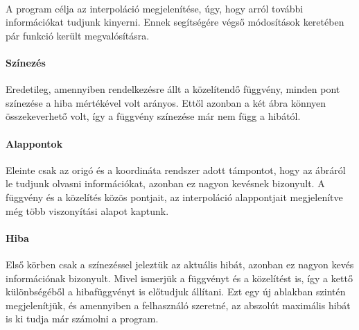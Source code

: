 \documentclass[12pt]{report}
\begin{document}
\paragraph{}
A program célja az interpoláció megjelenítése, úgy, hogy arról további információkat tudjunk kinyerni. Ennek segítségére végső módosítások keretében pár funkció került megvalósításra.

\paragraph{Színezés}
Eredetileg, amennyiben rendelkezésre állt a közelítendő függvény, minden pont színezése a hiba mértékével volt arányos. Ettől azonban a két ábra könnyen összekeverhető volt, így a függvény színezése már nem függ a hibától.

\paragraph{Alappontok}
Eleinte csak az origó és a koordináta rendszer adott támpontot, hogy az ábráról le tudjunk olvasni információkat, azonban ez nagyon kevésnek bizonyult. A függvény és a közelítés közös pontjait, az interpoláció alappontjait megjelenítve még több viszonyítási alapot kaptunk.

\paragraph{Hiba}
Első körben csak a színezéssel jeleztük az aktuális hibát, azonban ez nagyon kevés információnak bizonyult. Mivel ismerjük a függvényt és a közelítést is, így a kettő különbségéből a hibafüggvényt is előtudjuk állítani. Ezt egy új ablakban szintén megjelenítjük, és amennyiben a felhasználó szeretné, az abszolút maximális hibát is ki tudja már számolni a program.
\end{document}
